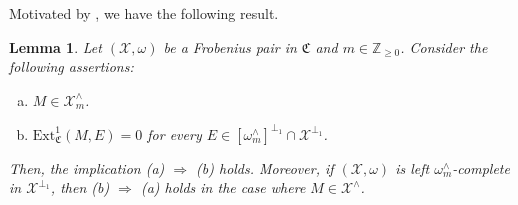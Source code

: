 \documentclass[10pt,reqno]{amsart}
\numberwithin{equation}{section}
\newtheorem{lemma}[definition]{Lemma}
\theoremstyle{remark}
\newcommand{\Ext}{\mathrm{Ext}}
\begin{document}
Motivated by \cite[Thm. 3.3]{Chains}, we have the following result.
  

\begin{lemma} \label{Lema01}
Let $(\mathcal{X},\omega)$ be a Frobenius pair in $\mathfrak{C}$ and $m \in \mathbb{Z}_{\geq 0}$. Consider the following assertions:
\begin{enumerate}[(a)]
\item $M \in \mathcal{X}^\wedge_m$.

\item $\Ext^1_{\mathfrak{C}}(M,E) = 0$ for every $E \in [\omega^\wedge_m]^{\perp_1} \cap \mathcal{X}^{\perp_1}$.
\end{enumerate} 
Then, the implication (a) $\Rightarrow$ (b) holds. Moreover, if $(\mathcal{X},\omega)$ is left $\omega^\wedge_m$-complete in $\mathcal{X}^{\perp_1}$, then (b) $\Rightarrow$ (a) holds in the case where $M \in \mathcal{X}^\wedge$. \\
\end{lemma}
\end{document}
